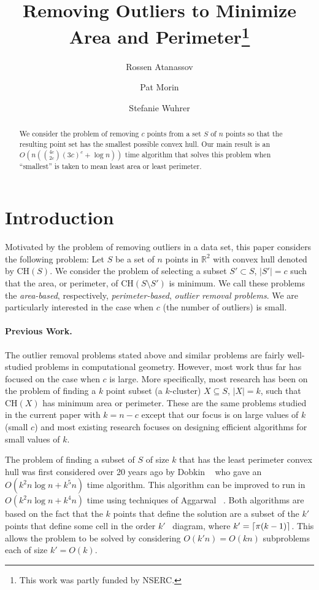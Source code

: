 \documentclass[lotsofwhite]{patmorin}
\title{
\vc{\MakeUppercase{Removing Outliers to Minimize Area and Perimeter}}
{Removing Outliers to Minimize Area and Perimeter}\thanks{This
work was partly funded by NSERC.}}
\author{Rossen Atanassov \and
	Pat Morin \and
	Stefanie Wuhrer}
\date{}
\newcommand{\ch}{\mathrm{CH}}
\newcommand{\runtime}{n\left({4c\choose 2c}(3c)^c + \log n\right)}
\newcommand{\Oruntime}{O\left(\runtime\right)}
\begin{document}
\maketitle

\begin{abstract}
We consider the problem of removing $c$ points from a set $S$ of $n$
points so that the resulting point set has the smallest possible
convex hull.  Our main result is an $\Oruntime$ time algorithm
that solves this problem when ``smallest'' is taken to mean least area
or least perimeter.
\end{abstract}

\section{Introduction}

Motivated by the problem of removing outliers in a data set, this
paper considers the following problem: Let $S$ be a set of $n$ points
in $\mathbb{R}^2$ with convex hull denoted by $\ch(S)$.  We consider
the problem of selecting a subset $S'\subset S$, $|S'|=c$ such that
the area, or perimeter, of $\ch(S\setminus S')$ is minimum.  We call
these problems the \emph{area-based}, respectively,
\emph{perimeter-based}, \emph{outlier removal problems}.  We are
particularly interested in the case when $c$ (the number of outliers)
is small.

\paragraph{Previous Work.} 

The outlier removal problems stated above and similar problems are
fairly well-studied problems in computational geometry.  However, most
work thus far has focused on the case when $c$ is large. More
specifically, most research has been on the problem of finding a $k$
point subset (a $k$-cluster) $X\subseteq S$, $|X|=k$, such that
$\ch(X)$ has minimum area or perimeter. These are the same problems
studied in the current paper with $k=n-c$ except that our focus is on
large values of $k$ (small $c$) and most existing research focuses on
designing efficient algorithms for small values of $k$.

The problem of finding a subset of $S$ of size $k$ that has the least
perimeter convex hull was first considered over 20 years ago by Dobkin
\etal\ \cite{ddg83} who gave an $O(k^2n\log n + k^5 n)$ time
algorithm.  This algorithm can be improved to run in $O(k^2 n\log n +
k^4 n)$ time using techniques of Aggarwal \etal\ \cite{aiks89}.  Both
algorithms are based on the fact that the $k$ points that define the
solution are a subset of the $k'$ points that define some cell in the
order $k'$ \voronoi\ diagram, where $k'=\left\lceil \pi (k-1) \right\rceil$.  This
allows the problem to be solved by considering $O(k'n)=O(kn)$ subproblems
each of size $k'=O(k)$.
\end{document}
